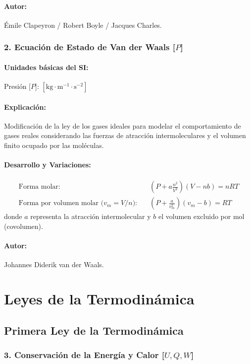 \documentclass[12pt,a4paper]{article}
\begin{document}
\paragraph*{Autor:} Émile Clapeyron / Robert Boyle / Jacques Charles.

\subsubsection*{2. Ecuación de Estado de Van der Waals [$P$]}
\paragraph*{Unidades básicas del SI:} Presión [$P$]: $[\text{kg}\cdot\text{m}^{-1}\cdot\text{s}^{-2}]$
\paragraph*{Explicación:} Modificación de la ley de los gases ideales para modelar el comportamiento de gases reales considerando las fuerzas de atracción intermoleculares y el volumen finito ocupado por las moléculas.
\paragraph*{Desarrollo y Variaciones:}
\begin{align*}
\text{Forma molar:} \quad & \left( P + a \frac{n^2}{V^2} \right) (V - n b) = n R T \\
\text{Forma por volumen molar ($v_m = V/n$):} \quad & \left( P + \frac{a}{v_m^2} \right) (v_m - b) = R T
\end{align*}
donde $a$ representa la atracción intermolecular y $b$ el volumen excluido por mol (covolumen).
\paragraph*{Autor:} Johannes Diderik van der Waals.

\section{Leyes de la Termodinámica}

\subsection{Primera Ley de la Termodinámica}

\subsubsection*{3. Conservación de la Energía y Calor [$U, Q, W$]}
\end{document}

